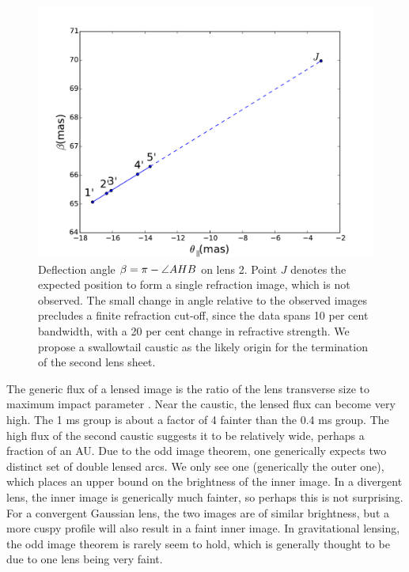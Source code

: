 \documentclass[useAMS,usenatbib]{mn2e}
\begin{document}
\begin{figure}
\centering
\includegraphics[width=1.0\linewidth]{Reflection_angle_Nov25.pdf}
\caption{Deflection angle $\beta=\pi-\protect\angle AHB$ on lens 2.  Point $J$ denotes the expected position to form a single refraction image, which is not
  observed.   The small change in angle relative to the observed
  images precludes a finite refraction cut-off, since the data spans
  10 per cent bandwidth, with a 20 per cent change in refractive strength.  We
  propose a swallowtail caustic as the likely origin for the
  termination of the second lens sheet.
}
\label{vtrans}
\end{figure}

The generic flux of a lensed image is the ratio of the lens transverse
size to maximum impact parameter \citep{2012MNRAS.421L.132P}.  Near
the caustic, the lensed flux can become very high.  The 1 ms group is
about a factor of 4 fainter than the 0.4 ms group.  The high flux of
the second caustic suggests it to be relatively wide, perhaps a
fraction of an AU.  Due to the odd image theorem, one generically
expects two distinct set of double lensed arcs.  We only see one
(generically the outer one), which places an upper bound on the
brightness of the inner image.  In a divergent
lens\citep{1998ApJ...496..253C}, the inner image is generically much
fainter, so perhaps this is not surprising.  For a convergent Gaussian lens,
the two images are of similar brightness, but a more cuspy profile
will also result in a faint inner image.  In gravitational lensing,
the odd image theorem is rarely seem to hold, which is generally thought to be
due to one lens being very faint.
\end{document}
